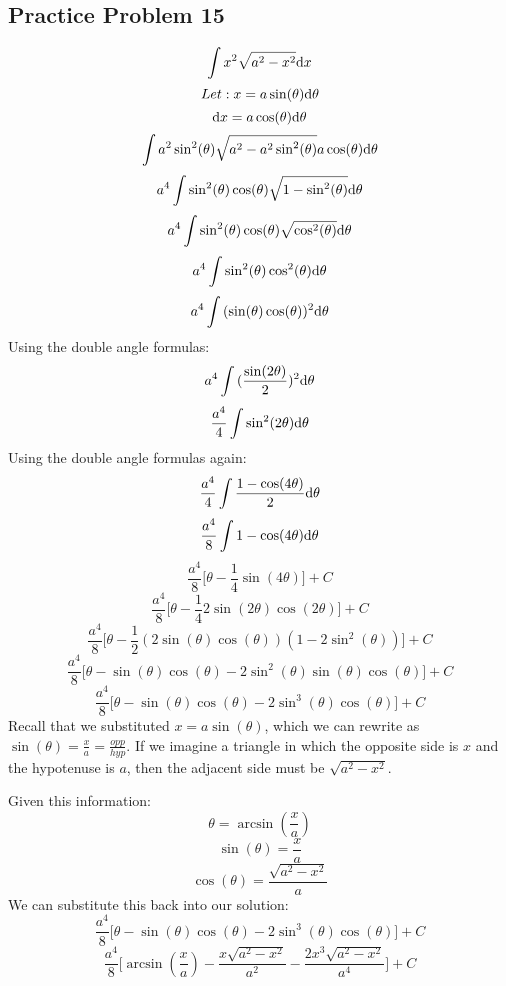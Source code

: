 \documentclass{math}
\begin{document}
\subsection*{Practice Problem 15}
\[ \int{x^{2}\sqrt{a^{2}-x^{2}}\mathrm{d}{x}} \]
\[ Let: x = a\sin(\theta)\mathrm{d}{\theta} \]
\[ \mathrm{d}{x} = a\cos(\theta)\mathrm{d}{\theta} \]
\[ \int{a^{2}\sin^{2}(\theta)
   \sqrt{a^{2}-a^{2}\sin^{2}(\theta)}a\cos(\theta)\mathrm{d}{\theta}} \]
\[ a^{4}\int{\sin^{2}(\theta)\cos(\theta)
   \sqrt{1-\sin^{2}(\theta)}\mathrm{d}{\theta}} \]
\[ a^{4}\int{\sin^{2}(\theta)\cos(\theta)
   \sqrt{\cos^{2}(\theta)}\mathrm{d}{\theta}} \]
\[ a^{4}\int{\sin^{2}(\theta)\cos^{2}(\theta)\mathrm{d}{\theta}} \]
\[ a^{4}\int{(\sin(\theta)\cos(\theta))^{2}\mathrm{d}{\theta}} \]
Using the double angle formulas:
\[ a^{4}\int{(\frac{\sin(2\theta)}{2})^{2}\mathrm{d}{\theta}} \]
\[ \frac{a^{4}}{4}\int{\sin^{2}(2\theta)\mathrm{d}{\theta}} \]
Using the double angle formulas again:
\[ \frac{a^{4}}{4}\int{\frac{1-\cos(4\theta)}{2}\mathrm{d}{\theta}} \]
\[ \frac{a^{4}}{8}\int{1-\cos(4\theta)\mathrm{d}{\theta}} \]
\[ \frac{a^{4}}{8}\bigg[\theta-\frac{1}{4}\sin(4\theta)\bigg]+C \]
\[ \frac{a^{4}}{8}\bigg[\theta-\frac{1}{4}2\sin(2\theta)\cos(2\theta)\bigg]+C \]
\[ \frac{a^{4}}{8}\bigg[\theta-
   \frac{1}{2}(2\sin(\theta)\cos(\theta))(1-2\sin^{2}(\theta))\bigg]+C \]
\[ \frac{a^{4}}{8}\bigg[\theta-
   \sin(\theta)\cos(\theta)-2\sin^{2}(\theta)\sin(\theta)\cos(\theta)\bigg]+C \]
\[ \frac{a^{4}}{8}\bigg[\theta-
   \sin(\theta)\cos(\theta)-2\sin^{3}(\theta)\cos(\theta)\bigg]+C \]
Recall that we substituted \( x = a\sin(\theta) \), which we can rewrite as
\( \sin(\theta) = \frac{x}{a} = \frac{opp}{hyp} \). If we imagine a triangle in
which the opposite side is \( x \) and the hypotenuse is \( a \), then the
adjacent side must be \( \sqrt{a^{2}-x^{2}} \).
\begin{center}
\end{center}
Given this information:
\[ \theta = \arcsin(\frac{x}{a}) \]
\[ \sin(\theta) = \frac{x}{a} \]
\[ \cos(\theta) = \frac{\sqrt{a^{2}-x^{2}}}{a} \]
We can substitute this back into our solution:
\[ \frac{a^{4}}{8}\bigg[\theta-
\sin(\theta)\cos(\theta)-2\sin^{3}(\theta)\cos(\theta)\bigg]+C \]
\[ \frac{a^{4}}{8}\bigg[\arcsin(\frac{x}{a})-
   \frac{x\sqrt{a^{2}-x^{2}}}{a^{2}}-
   \frac{2x^{3}\sqrt{a^{2}-x^{2}}}{a^{4}}\bigg]+C \]
\end{document}

